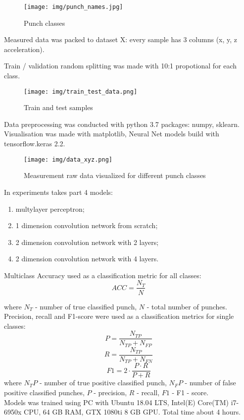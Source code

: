 \documentclass[sport,article,submit,moreauthors,pdftex]{Definitions/mdpi}
\begin{document}
\begin{figure}[H]
\texttt{[image: img/punch\_names.jpg]}
\caption{Punch classes}
\end{figure} 

Measured data was packed to dataset X: every sample has 3 columns (x, y, z acceleration).

Train / validation random splitting was made with 10:1 propotional for each class.

\begin{figure}[H]
\texttt{[image: img/train\_test\_data.png]}
\caption{Train and test samples}
\end{figure} 

 Data preprocessing was conducted with python 3.7 packages: numpy, sklearn. Visualisation was made with matplotlib, Neural Net models build with tensorflow.keras 2.2.  
 
\begin{figure}[H]
\texttt{[image: img/data\_xyz.png]}
\caption{Measurement raw data visualized for different punch classes}
\end{figure} 

In experiments takes part 4 models:
\begin{enumerate}
\item	multylayer perceptron; 
\item	1 dimension convolution network from scratch;
\item	2 dimension convolution network with 2 layers;
\item	2 dimension convolution network with 4 layers.
\end{enumerate}

Multiclass Accuracy used as a classification metric for all classes:
\begin{equation}
ACC = \frac{N_T}{N}
\end{equation}

where $N_T$ - number of true classified punch,  
$N$ - total number of punches.\\
Precision, recall and F1-score were used as a classification metrics for single classes:
\begin{equation}
P = \frac{N_{TP}}{N_{TP} + N_{FP}}
\end{equation}
\begin{equation}
R = \frac{N_{TP}}{N_{TP} + N_{FN}}
\end{equation}
\begin{equation}
F1 = 2 \cdot \frac{P \cdot R}{P + R}
\end{equation}
where $N_TP$ - number of true positive classified punch,  
$N_FP$ - number of false positive classified punches, $P$ - precision, $R$ - recall, $F1$ - F1 - score.\\
Models was trained using PC with Ubuntu 18.04 LTS, Intel(E) Core(TM) i7-6950x CPU, 64 GB RAM, GTX 1080ti 8 GB GPU. Total time about 4 hours.
\end{document}
